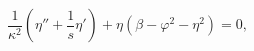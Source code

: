 \begin{equation}\label{eq2}
\frac{1}{\kappa^2}\left( \eta'' + \frac{1}{s}\eta'\right) 
+ \eta(\beta - \varphi^2 -\eta^2)=0,
\end{equation}

